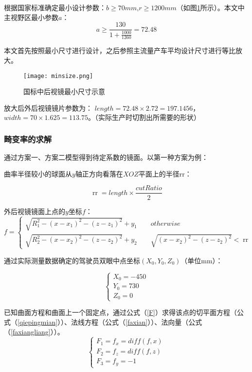 \documentclass[bwprint]{cumcmthesis}
\begin{document}
\par 根据国家标准确定最小设计参数：$b \geqslant 70mm$,$r \geqslant 1200mm$（如图\ref{fig:后视镜最小尺寸示意}所示）。本文中主视野区最小参数$a$：
$$a \geqslant \frac{130}{1+\frac{1000}{1260}} = 72.48$$

\par 本文首先按照最小尺寸进行设计，之后参照主流量产车平均设计尺寸进行等比放大。
\begin{figure}[h]
\small
\centering
\texttt{[image: minsize.png]}
\caption{国标中后视镜最小尺寸示意} \label{fig:后视镜最小尺寸示意}
\end{figure}

\par 放大后外后视镜镜片参数为：
$length = 72.48\times 2.72 = 197.1456$，            
$width = 70 \times 1.625 = 113.75$。（实际生产时切割出所需要的形状）

\subsubsection{畸变率的求解}

\par 通过方案一、方案二模型得到待定系数的镜面。以第一种方案为例：
\par 曲率半径较小的球面从$y$轴正方向看落在$XOZ$平面上的半径rr：

\begin{equation}
	\mathop{rr} = length \times \frac{cutRatio}{2}
\end{equation}

\par 外后视镜镜面上点的$y$坐标$f$：
\begin{equation}
	f = 
	\begin{cases}
		\sqrt{R_1^2 - (x-x_1)^2 - (z - z_1)^2} + y_1\quad \quad otherwise
		\\
		\sqrt{R_2^2 - (x-x_2)^2 - (z - z_2)^2} + y_2 \quad \quad 
		\sqrt{(x-x_2)^2 - (z - z_2)^2} < \mathop{rr} 
	\end{cases} 
\end{equation}

\par 通过实际测量数据确定的驾驶员双眼中点坐标$(X_0,Y_0,Z_0)$（单位mm）：

\begin{equation}
	\begin{cases}
		X_0 = -450 \\ 
		Y_0 = 730 \\
		Z_0 = 0 
	\end{cases} 
\end{equation}
\par 已知曲面方程和曲面上一个固定点，通过公式（\ref{F}）求得该点的切平面方程（公式（\ref{qiepingmian}））、法线方程（公式（\ref{faxian}））、法向量（公式（\ref{faxiangliang}））。
\begin{equation}
\label{F}
	\begin{cases}
		F_1 = f_x = diff(f,x) \\
		F_2 = f_z = diff(f,z) \\
		F_3 = f_y = -1
	\end{cases}
\end{equation}
\end{document}
